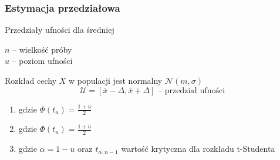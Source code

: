 \documentclass[../Matematyka.tex]{subfiles}
\begin{document}
\newpage
\subsubsection*{Estymacja przedziałowa}
\begin{multicols}{2}
    Przedziały ufności dla średniej

    \(n\) -- wielkość próby\\
    \(u\) -- poziom ufności
\end{multicols}
Rozkład cechy \(X\) w populacji jest normalny \(\mathcal{N}(m, \sigma)\)
\[\mathcal{U} = [\bar{x}-\Delta, \bar{x}+\Delta] \text{ -- przedział ufności}\]

\begin{enumerate}
    \item {}  gdzie \(\Phi(t_u) = \frac{1+u}{2}\)
    \item {}  gdzie \(\Phi(t_u) = \frac{1+u}{2}\)
    \item {}  gdzie \(\alpha = 1-u\) oraz \(t_{\alpha, n-1}\) wartość krytyczna dla rozkładu t-Studenta
\end{enumerate}
\end{document}
